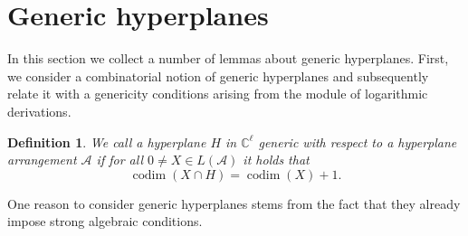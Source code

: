 \documentclass[a4paper,11pt]{amsart}
\def\CC{{\mathbb{C}}}%
\def\C{{\mathbb{C}}}%
\def\A{{\mathcal{A}}}%
\def\C{{\mathcal{C}}}%
\DeclareMathOperator{\codim}{codim}
\numberwithin{equation}{section}
\newtheorem{define}[theorem]{Definition}
\theoremstyle{remark}
\begin{document}
\section{Generic hyperplanes}\label{sec:generic}

In this section we collect a number of lemmas about generic hyperplanes.
First, we consider a combinatorial notion of generic hyperplanes and subsequently relate it with a genericity conditions arising from the module of logarithmic derivations.


\begin{define}
	We call a hyperplane $H$ in $\CC^\ell$ \emph{generic with respect to a hyperplane arrangement} $\mathcal{A}$ if for all $0\neq X \in L(\A)$ it holds that 
	\[
		\codim(X\cap H)=\codim(X)+1.
	\]
\end{define}

%


One reason to consider generic hyperplanes stems from the fact that they already impose strong algebraic conditions.
\end{document}
